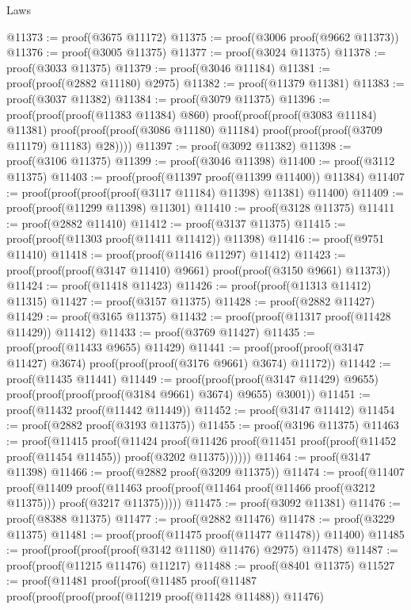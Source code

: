 \begin{lexlean}{Laws}
\begin{coremodule}
@11373 := proof(@3675 @11172)
@11375 := proof(@3006 proof(@9662 @11373))
@11376 := proof(@3005 @11375)
@11377 := proof(@3024 @11375)
@11378 := proof(@3033 @11375)
@11379 := proof(@3046 @11184)
@11381 := proof(proof(@2882 @11180) @2975)
@11382 := proof(@11379 @11381)
@11383 := proof(@3037 @11382)
@11384 := proof(@3079 @11375)
@11396 := proof(proof(proof(@11383 @11384) @860)
      proof(proof(proof(@3083 @11184) @11381)
          proof(proof(proof(@3086 @11180) @11184) proof(proof(proof(@3709 @11179) @11183) @28))))
@11397 := proof(@3092 @11382)
@11398 := proof(@3106 @11375)
@11399 := proof(@3046 @11398)
@11400 := proof(@3112 @11375)
@11403 := proof(proof(@11397 proof(@11399 @11400)) @11384)
@11407 := proof(proof(proof(proof(@3117 @11184) @11398) @11381) @11400)
@11409 := proof(proof(@11299 @11398) @11301)
@11410 := proof(@3128 @11375)
@11411 := proof(@2882 @11410)
@11412 := proof(@3137 @11375)
@11415 := proof(proof(@11303 proof(@11411 @11412)) @11398)
@11416 := proof(@9751 @11410)
@11418 := proof(proof(@11416 @11297) @11412)
@11423 := proof(proof(proof(@3147 @11410) @9661) proof(proof(@3150 @9661) @11373))
@11424 := proof(@11418 @11423)
@11426 := proof(proof(@11313 @11412) @11315)
@11427 := proof(@3157 @11375)
@11428 := proof(@2882 @11427)
@11429 := proof(@3165 @11375)
@11432 := proof(proof(@11317 proof(@11428 @11429)) @11412)
@11433 := proof(@3769 @11427)
@11435 := proof(proof(@11433 @9655) @11429)
@11441 := proof(proof(proof(@3147 @11427) @3674) proof(proof(proof(@3176 @9661) @3674) @11172))
@11442 := proof(@11435 @11441)
@11449 := proof(proof(proof(@3147 @11429) @9655)
      proof(proof(proof(proof(@3184 @9661) @3674) @9655) @3001))
@11451 := proof(@11432 proof(@11442 @11449))
@11452 := proof(@3147 @11412)
@11454 := proof(@2882 proof(@3193 @11375))
@11455 := proof(@3196 @11375)
@11463 := proof(@11415
      proof(@11424
          proof(@11426
              proof(@11451 proof(proof(@11452 proof(@11454 @11455)) proof(@3202 @11375))))))
@11464 := proof(@3147 @11398)
@11466 := proof(@2882 proof(@3209 @11375))
@11474 := proof(@11407
      proof(@11409
          proof(@11463 proof(proof(@11464 proof(@11466 proof(@3212 @11375))) proof(@3217 @11375)))))
@11475 := proof(@3092 @11381)
@11476 := proof(@8388 @11375)
@11477 := proof(@2882 @11476)
@11478 := proof(@3229 @11375)
@11481 := proof(proof(@11475 proof(@11477 @11478)) @11400)
@11485 := proof(proof(proof(proof(@3142 @11180) @11476) @2975) @11478)
@11487 := proof(proof(@11215 @11476) @11217)
@11488 := proof(@8401 @11375)
@11527 := proof(@11481
      proof(proof(@11485
            proof(@11487
                proof(proof(proof(proof(@11219 proof(@11428 @11488)) @11476)

\end{coremodule}
\end{lexlean}
